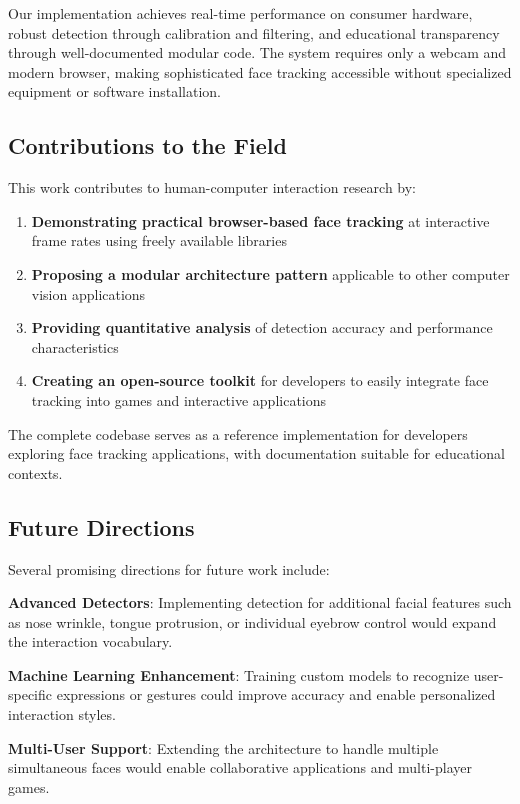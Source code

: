 \documentclass[sigconf]{acmart}
\begin{document}
Our implementation achieves real-time performance on consumer hardware, robust detection through calibration and filtering, and educational transparency through well-documented modular code. The system requires only a webcam and modern browser, making sophisticated face tracking accessible without specialized equipment or software installation.

\subsection{Contributions to the Field}

This work contributes to human-computer interaction research by:

\begin{enumerate}
\item \textbf{Demonstrating practical browser-based face tracking} at interactive frame rates using freely available libraries
\item \textbf{Proposing a modular architecture pattern} applicable to other computer vision applications
\item \textbf{Providing quantitative analysis} of detection accuracy and performance characteristics
\item \textbf{Creating an open-source toolkit} for developers to easily integrate face tracking into games and interactive applications
\end{enumerate}

The complete codebase serves as a reference implementation for developers exploring face tracking applications, with documentation suitable for educational contexts.

\subsection{Future Directions}

Several promising directions for future work include:

\textbf{Advanced Detectors}: Implementing detection for additional facial features such as nose wrinkle, tongue protrusion, or individual eyebrow control would expand the interaction vocabulary.

\textbf{Machine Learning Enhancement}: Training custom models to recognize user-specific expressions or gestures could improve accuracy and enable personalized interaction styles.

\textbf{Multi-User Support}: Extending the architecture to handle multiple simultaneous faces would enable collaborative applications and multi-player games.
\end{document}
